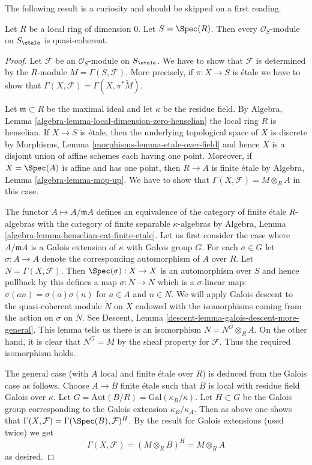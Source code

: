 \noindent
The following result is a curiosity and should be skipped on a
first reading.

\begin{lemma}
\label{lemma-all-modules-quasi-coherent}
Let $R$ be a local ring of dimension $0$. Let $S = \Spec(R)$.
Then every $\mathcal{O}_S$-module on $S_\etale$ is quasi-coherent.
\end{lemma}

\begin{proof}
Let $\mathcal{F}$ be an $\mathcal{O}_S$-module on $S_\etale$.
We have to show that $\mathcal{F}$ is determined by the
$R$-module $M = \Gamma(S, \mathcal{F})$.
More precisely, if $\pi : X \to S$ is \'etale we have to
show that $\Gamma(X, \mathcal{F}) = \Gamma(X, \pi^*\widetilde{M})$.

\medskip\noindent
Let $\mathfrak m \subset R$ be the maximal ideal and let
$\kappa$ be the residue field. By
Algebra, Lemma \ref{algebra-lemma-local-dimension-zero-henselian}
the local ring $R$ is henselian. If $X \to S$ is \'etale,
then the underlying topological space of $X$ is discrete
by Morphisms, Lemma \ref{morphisms-lemma-etale-over-field}
and hence $X$ is a disjoint union of affine schemes
each having one point. Moreover, if $X = \Spec(A)$ is affine and
has one point, then $R \to A$ is finite \'etale by
Algebra, Lemma \ref{algebra-lemma-mop-up}.
We have to show that $\Gamma(X, \mathcal{F}) = M \otimes_R A$
in this case.

\medskip\noindent
The functor $A \mapsto A/\mathfrak m A$ defines an equivalence of
the category of finite \'etale $R$-algebras
with the category of finite separable $\kappa$-algebras by
Algebra, Lemma \ref{algebra-lemma-henselian-cat-finite-etale}.
Let us first consider the case where $A/\mathfrak m A$
is a Galois extension of $\kappa$ with Galois group $G$.
For each $\sigma \in G$ let $\sigma : A \to A$ denote the
corresponding automorphism of $A$ over $R$.
Let $N = \Gamma(X, \mathcal{F})$.
Then $\Spec(\sigma) : X \to X$ is an automorphism over $S$
and hence pullback by this defines a map $\sigma : N \to N$
which is a $\sigma$-linear map: $\sigma(an) = \sigma(a) \sigma(n)$
for $a \in A$ and $n \in N$.
We will apply Galois descent to the quasi-coherent module
$\widetilde{N}$ on $X$ endowed with the isomorphisms
coming from the action on $\sigma$ on $N$. See Descent, Lemma
\ref{descent-lemma-galois-descent-more-general}.
This lemma tells us there is an isomorphism $N = N^G \otimes_R A$.
On the other hand, it is clear that $N^G = M$ by the sheaf property
for $\mathcal{F}$. Thus the required isomorphism holds.

\medskip\noindent
The general case (with $A$ local and finite \'etale over $R$)
is deduced from the Galois case as follows. Choose $A \to B$
finite \'etale such that $B$ is local with residue field
Galois over $\kappa$. Let $G = \text{Aut}(B/R) = \text{Gal}(\kappa_B/\kappa)$.
Let $H \subset G$ be the Galois group corresponding to the
Galois extension $\kappa_B/\kappa_A$. Then as above one
shows that $\Gamma(X, \mathcal{F}) = \Gamma(\Spec(B), \mathcal{F})^H$.
By the result for Galois extensions (used twice) we get
$$
\Gamma(X, \mathcal{F}) = (M \otimes_R B)^H = M \otimes_R A
$$
as desired.
\end{proof}
